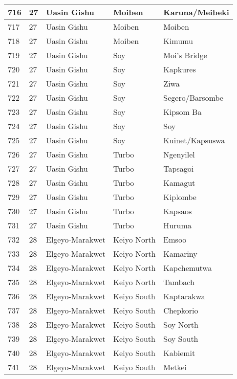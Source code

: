 \begin{table}[!ht]
\begin{tabular}{|l|l|l|l|l|}
        716 & 27 & Uasin Gishu & Moiben & Karuna/Meibeki \\ \hline
        717 & 27 & Uasin Gishu & Moiben & Moiben \\ \hline
        718 & 27 & Uasin Gishu & Moiben & Kimumu \\ \hline
        719 & 27 & Uasin Gishu & Soy & Moi’s Bridge \\ \hline
        720 & 27 & Uasin Gishu & Soy & Kapkures \\ \hline
        721 & 27 & Uasin Gishu & Soy & Ziwa \\ \hline
        722 & 27 & Uasin Gishu & Soy & Segero/Barsombe \\ \hline
        723 & 27 & Uasin Gishu & Soy & Kipsom Ba \\ \hline
        724 & 27 & Uasin Gishu & Soy & Soy \\ \hline
        725 & 27 & Uasin Gishu & Soy & Kuinet/Kapsuswa \\ \hline
        726 & 27 & Uasin Gishu & Turbo & Ngenyilel \\ \hline
        727 & 27 & Uasin Gishu & Turbo & Tapsagoi \\ \hline
        728 & 27 & Uasin Gishu & Turbo & Kamagut \\ \hline
        729 & 27 & Uasin Gishu & Turbo & Kiplombe \\ \hline
        730 & 27 & Uasin Gishu & Turbo & Kapsaos \\ \hline
        731 & 27 & Uasin Gishu & Turbo & Huruma \\ \hline
        732 & 28 & Elgeyo-Marakwet & Keiyo North & Emsoo \\ \hline
        733 & 28 & Elgeyo-Marakwet & Keiyo North & Kamariny \\ \hline
        734 & 28 & Elgeyo-Marakwet & Keiyo North & Kapchemutwa \\ \hline
        735 & 28 & Elgeyo-Marakwet & Keiyo North & Tambach \\ \hline
        736 & 28 & Elgeyo-Marakwet & Keiyo South & Kaptarakwa \\ \hline
        737 & 28 & Elgeyo-Marakwet & Keiyo South & Chepkorio \\ \hline
        738 & 28 & Elgeyo-Marakwet & Keiyo South & Soy North \\ \hline
        739 & 28 & Elgeyo-Marakwet & Keiyo South & Soy South \\ \hline
        740 & 28 & Elgeyo-Marakwet & Keiyo South & Kabiemit \\ \hline
        741 & 28 & Elgeyo-Marakwet & Keiyo South & Metkei \\ \hline

\end{tabular}
\end{table}
